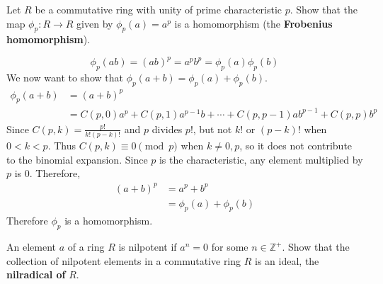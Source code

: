 \documentclass[11pt]{article}
\begin{document}
\begin{problem}[26.20]
    Let $R$ be a commutative ring with unity of prime characteristic $p$.
    Show that the map $\phi_p: R \rightarrow R$ given by
    $\phi_p(a) = a^p$ is a homomorphism (the \textbf{Frobenius homomorphism}).
\end{problem}
\begin{solution}
    \[
    \phi_p(ab) = (ab)^p = a^p b^p = \phi_p(a)\phi_p(b)
    \]
    We now want to show that $\phi_p(a + b) = \phi_p(a) + \phi_p(b)$.
    \begin{align*}
        \phi_p(a + b) &= (a+b)^p \\
        &= C(p,0)a^p + C(p,1)a^{p-1}b + \cdots + C(p, p - 1)ab^{p-1} + C(p,p)b^p
    \end{align*}
    Since $C(p,k) = \frac{p!}{k!(p-k)!}$ and $p$ divides $p!$, but not $k!$ or $(p-k)!$ when $0 < k < p$. Thus $C(p,k) \equiv 0 \pmod{p}$ when $k \neq 0, p$, so it does not contribute to the binomial expansion. Since $p$ is the characteristic, any element multiplied by $p$ is 0. Therefore,
    \begin{align*}
        (a+b)^p &= a^p + b^p\\
        &= \phi_p(a) + \phi_p(b)
    \end{align*}
    Therefore $\phi_p$ is a homomorphism.
\end{solution}
\begin{problem}[26.30]
    An element $a$ of a ring $R$ is nilpotent if $a^n = 0$ for some $n \in \mathbb{Z}^+$. Show that the collection of nilpotent elements in a commutative ring $R$ is an ideal, the \textbf{nilradical of} $R$.
    
\end{problem}
\end{document}
